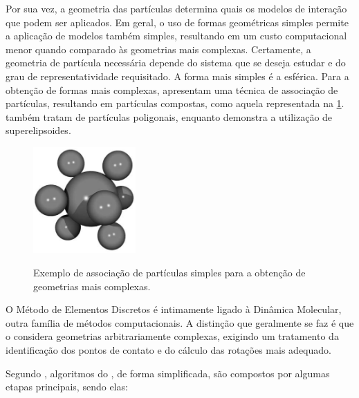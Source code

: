 Por sua vez, a geometria das partículas determina quais os modelos de interação que podem ser aplicados. Em geral, o uso de formas geométricas simples permite a aplicação de modelos também simples, resultando em um custo computacional menor quando comparado às geometrias mais complexas. Certamente, a geometria de partícula necessária depende do sistema que se deseja estudar e do grau de representatividade requisitado. A forma mais simples é a esférica. Para a obtenção de formas mais complexas,  apresentam uma técnica de associação de partículas, resultando em partículas compostas, como aquela representada na \cref{fig:composite_particle}.  também tratam de partículas poligonais, enquanto  demonstra a utilização de superelipsoides.

\begin{figure}[h]
	\caption{Exemplo de associação de partículas simples para a obtenção de geometrias mais complexas.}
	\centering
		\includegraphics[width=0.35\textwidth]{images/introduction/composite_particle.png}
	\label{fig:composite_particle}
\end{figure}

O Método de Elementos Discretos é intimamente ligado à Dinâmica Molecular, outra família de métodos computacionais. A distinção que geralmente se faz é que o \DEM{} considera geometrias arbitrariamente complexas, exigindo um tratamento da identificação dos pontos de contato e do cálculo das rotações mais adequado.

Segundo , algoritmos do \DEM{}, de forma simplificada, são compostos por algumas etapas principais, sendo elas:

